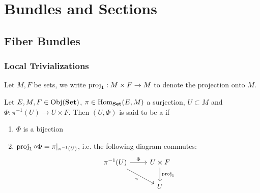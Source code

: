 \documentclass{book}
\begin{document}
	
	
	
	
	
	
	
	






	
	
	
	
	
	
	
	
	
	
	
	
	
	
	
	
	
	
	
	
	
	
	
	
	
	\newpage
	\chapter{Bundles and Sections}
	
	\section{Fiber Bundles}
	
	\subsection{Local Trivializations}
	
	\begin{note}
		Let $M, F$ be sets, we write $\operatorname{\text{proj}}_1: M \times F \rightarrow M$ to denote the projection onto $M$.
	\end{note}

	\begin{defn}
		Let $E, M, F \in \operatorname{Obj}(\operatorname*{\text{\textbf{Set}}})$, $\pi \in \operatorname{Hom}_{\operatorname*{\text{\textbf{Set}}}}(E, M)$ a surjection, $U \subset M$ and $\Phi: \pi^{-1}(U) \rightarrow U \times F$. Then $(U, \Phi)$ is said to be a   if 
		\begin{enumerate}
			\item $\Phi$ is a bijection
			\item $\operatorname{\text{proj}}_1 \circ \Phi = \pi|_{\pi^{-1}(U)}$, i.e. the following diagram commutes:
			\[ 
			\begin{tikzcd}
				\pi^{-1}(U) \arrow[r, "\Phi"] \arrow[dr, "\pi"'] & U \times F \arrow[d, "\prj_1"]  \\
				& U
			\end{tikzcd}
			\]
		\end{enumerate}
	\end{defn}
	
\end{document}
